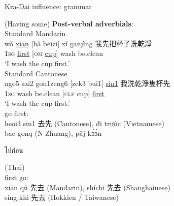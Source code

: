 \documentclass{beamer}
\begin{document}
\begin{frame}[fragile]{Kra-Dai influence: grammar}

{\small
(Having some) \textbf{Post-verbal adverbials}:\\
\medskip
Standard Mandarin\\
wǒ \underline{xiān} [bǎ bēizi] xǐ gānjìng 我先把杯子洗乾淨\\
\textsc{1sg} \underline{first} [\textsc{om} \underline{cup}] wash be.clean\\
\enquote*{I wash the cup first.}\\
\smallskip
Standard Cantonese\\
ngo5 sai2 gon1zeng6 [zek3 bui1] \underline{sin1} 我洗乾淨隻杯先\\
\textsc{1sg} wash be.clean [\textsc{clf} cup] \underline{first}\\
\enquote*{I wash the cup first.}\\
\bigskip
go first:\\
heoi3 sin1 去先 (Cantonese), đi trước (Vietnamese)\\ 
bae gonq (N Zhuang), pāj kɔ̀ɔ̀n \begin{thai}ไปก่อน\end{thai} (Thai)\\
\smallskip
first go:\\
xiān qù 先去 (Mandarin), shíchi 先去 (Shanghainese)\\ sing-khì 先去 (Hokkien / Taiwanese)\\

}
\end{frame}
\end{document}
